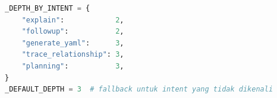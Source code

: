 \begin{lstlisting}[language=Python, caption={Kamus kedalaman \textit{traversal} per tipe \textit{intent} (\texttt{\_DEPTH\_BY\_INTENT})}, label={lst:depth-by-intent}, frame=single, captionpos=t]
_DEPTH_BY_INTENT = {
    "explain":            2,
    "followup":           2,
    "generate_yaml":      3,
    "trace_relationship": 3,
    "planning":           3,
}
_DEFAULT_DEPTH = 3  # fallback untuk intent yang tidak dikenali
\end{lstlisting}
